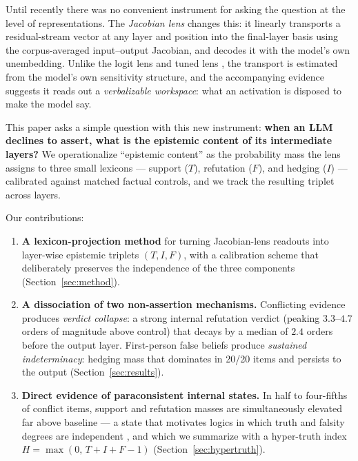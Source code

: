 \documentclass[11pt]{article}
\begin{document}
Until recently there was no convenient instrument for asking the question at
the level of representations. The \emph{Jacobian lens}
\cite{anthropic2026workspace} changes this: it linearly transports a
residual-stream vector at any layer and position into the final-layer basis
using the corpus-averaged input--output Jacobian, and decodes it with the
model's own unembedding. Unlike the logit lens \cite{nostalgebraist2020logit}
and tuned lens \cite{belrose2023tuned}, the transport is estimated from the
model's own sensitivity structure, and the accompanying evidence suggests it
reads out a \emph{verbalizable workspace}: what an activation is disposed to
make the model say.

This paper asks a simple question with this new instrument: \textbf{when an LLM
declines to assert, what is the epistemic content of its intermediate layers?}
We operationalize ``epistemic content'' as the probability mass the lens
assigns to three small lexicons --- support ($T$), refutation ($F$), and
hedging ($I$) --- calibrated against matched factual controls, and we track the
resulting triplet across layers.

Our contributions:
\begin{enumerate}
  \item \textbf{A lexicon-projection method} for turning Jacobian-lens readouts
  into layer-wise epistemic triplets $(T, I, F)$, with a calibration scheme
  that deliberately preserves the independence of the three components
  (Section~\ref{sec:method}).
  \item \textbf{A dissociation of two non-assertion mechanisms.} Conflicting
  evidence produces \emph{verdict collapse}: a strong internal refutation
  verdict (peaking $3.3$--$4.7$ orders of magnitude above control) that decays
  by a median of $2.4$ orders before the output layer. First-person false
  beliefs produce \emph{sustained indeterminacy}: hedging mass that dominates
  in 20/20 items and persists to the output (Section~\ref{sec:results}).
  \item \textbf{Direct evidence of paraconsistent internal states.} In half to
  four-fifths of conflict items, support and refutation masses are
  simultaneously elevated far above baseline --- a state that motivates
  logics in which truth and falsity degrees are independent
  \cite{smarandache1998neutrosophy,priest1979paradox}, and which we summarize
  with a hyper-truth index $H = \max(0,\, T+I+F-1)$
  (Section~\ref{sec:hypertruth}).
\end{enumerate}
\end{document}
